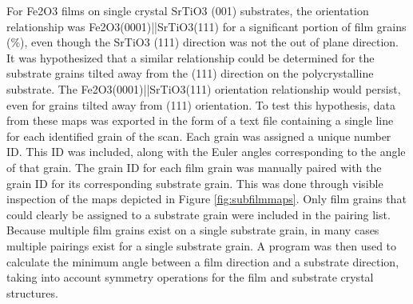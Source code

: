 \documentclass[12pt,%
              twoside,
               letterpaper]{uiothesis}
\begin{document}
For Fe2O3 films on single crystal SrTiO3 (001) substrates, the orientation
relationship was Fe2O3(0001)||\-SrTiO3(111) for a significant portion of film
grains (\%), even though the SrTiO3 (111) direction was not the out of
plane direction. It was hypothesized that a similar relationship could be determined for
the substrate grains tilted away from the (111) direction on the polycrystalline
substrate. The Fe2O3(0001)||SrTiO3(111) orientation relationship would persist,
even for grains tilted away from (111) orientation. To test this hypothesis, data from
these maps was exported in the form of a text file containing a single line for each
identified grain of the scan. Each grain was assigned a unique number ID. This ID was
included, along with the Euler angles corresponding to the angle of that grain.  The grain
ID for each film grain was manually paired with the grain ID for its corresponding
substrate grain. This was done through visible inspection of the maps depicted in Figure
\ref{fig:subfilmmaps}. Only film grains that could clearly be assigned to a substrate
grain were included in the pairing list. Because multiple film grains exist on a single
substrate grain, in many cases multiple pairings exist for a single substrate grain. A
program was then used to calculate the minimum angle between a film direction and a
substrate direction, taking into account symmetry operations for the film and substrate
crystal structures. 
\end{document}
